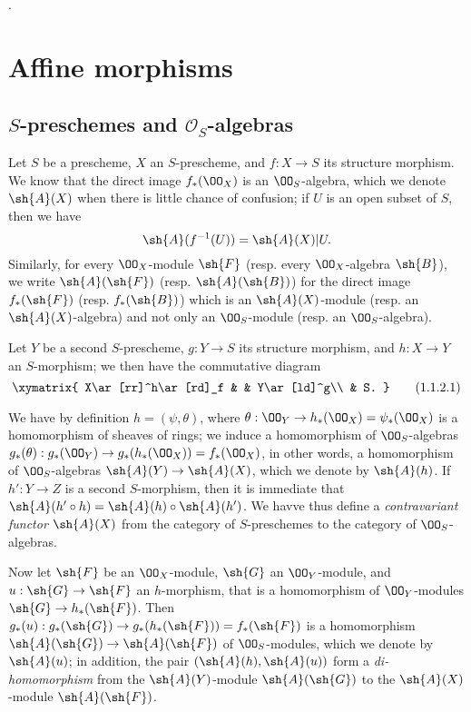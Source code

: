 \cite{I-1}.

\section{Affine morphisms}
\label{section:affine-morphisms}

\subsection{$S$-preschemes and $\mathcal{O}_S$-algebras}
\label{subsection:s-preschemes-algebras}

\begin{env}[1.1.1]
\label{2.1.1.1}
Let $S$ be a prescheme, $X$ an $S$-prescheme, and $f:X\to S$ its structure morphism.
We know  that the direct image $f_*(\OO_X)$ is an $\OO_S$-algebra, which we
denote $\sh{A}(X)$ when there is little chance of confusion; if $U$ is an open subset of $S$, then we have
\[
  \sh{A}(f^{-1}(U))=\sh{A}(X)|U.
\]
Similarly, for every $\OO_X$-module $\sh{F}$ (resp. every $\OO_X$-algebra $\sh{B}$), we write $\sh{A}(\sh{F})$ (resp. $\sh{A}(\sh{B})$) for the direct image $f_*(\sh{F})$ (resp. $f_*(\sh{B})$) which is an $\sh{A}(X)$-module (resp. an $\sh{A}(X)$-algebra) and not only an $\OO_S$-module (resp. an $\OO_S$-algebra).
\end{env}

\begin{env}[1.1.2]
\label{2.1.1.2}
Let $Y$ be a second $S$-prescheme, $g:Y\to S$ its structure morphism, and $h:X\to Y$ an $S$-morphism; we then have the commutative diagram
\[
\label{2.1.1.2.1}
  \xymatrix{
    X\ar[rr]^h\ar[rd]_f & &
    Y\ar[ld]^g\\
    & S.
  }
  \tag{1.1.2.1}
\]

We have by definition $h=(\psi,\theta)$, where $\theta:\OO_Y\to h_*(\OO_X)=\psi_*(\OO_X)$ is a homomorphism of sheaves of rings; we induce  a homomorphism of $\OO_S$-algebras $g_*(\theta):g_*(\OO_Y)\to g_*(h_*(\OO_X))=f_*(\OO_X)$, in other words, a homomorphism of $\OO_S$-algebras $\sh{A}(Y)\to\sh{A}(X)$, which we denote by $\sh{A}(h)$.
If $h':Y\to Z$ is a second $S$-morphism, then it is immediate that $\sh{A}(h'\circ h)=\sh{A}(h)\circ\sh{A}(h')$.
We havve thus define a \emph{contravariant functor $\sh{A}(X)$} from the category of $S$-preschemes to the category of $\OO_S$-algebras.

Now let $\sh{F}$ be an $\OO_X$-module, $\sh{G}$ an $\OO_Y$-module, and $u:\sh{G}\to\sh{F}$ an $h$-morphism, that is  a homomorphism of $\OO_Y$-modules $\sh{G}\to h_*(\sh{F})$.
Then $g_*(u):g_*(\sh{G})\to g_*(h_*(\sh{F}))=f_*(\sh{F})$ is a homomorphism $\sh{A}(\sh{G})\to\sh{A}(\sh{F})$ of $\OO_S$-modules, which we denote by $\sh{A}(u)$; in addition, the pair $(\sh{A}(h),\sh{A}(u))$ form a \emph{di-homomorphism} from the $\sh{A}(Y)$-module $\sh{A}(\sh{G})$ to the $\sh{A}(X)$-module $\sh{A}(\sh{F})$.
\end{env}

